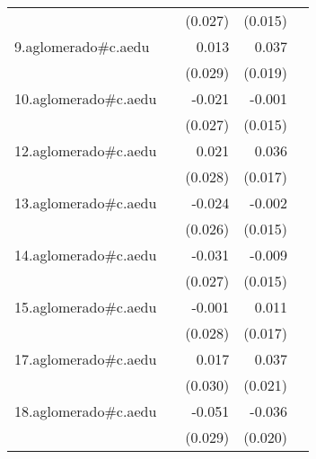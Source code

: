 {\begin{longtable}{l*{4}{D{.}{.}{-1}}}
            &                     &     (0.027)         &     (0.015)         &                     \\
\addlinespace
9.aglomerado#c.aedu&                     &       0.013         &       0.037         &                     \\
            &                     &     (0.029)         &     (0.019)         &                     \\
\addlinespace
10.aglomerado#c.aedu&                     &      -0.021         &      -0.001         &                     \\
            &                     &     (0.027)         &     (0.015)         &                     \\
\addlinespace
12.aglomerado#c.aedu&                     &       0.021         &       0.036\sym{*}  &                     \\
            &                     &     (0.028)         &     (0.017)         &                     \\
\addlinespace
13.aglomerado#c.aedu&                     &      -0.024         &      -0.002         &                     \\
            &                     &     (0.026)         &     (0.015)         &                     \\
\addlinespace
14.aglomerado#c.aedu&                     &      -0.031         &      -0.009         &                     \\
            &                     &     (0.027)         &     (0.015)         &                     \\
\addlinespace
15.aglomerado#c.aedu&                     &      -0.001         &       0.011         &                     \\
            &                     &     (0.028)         &     (0.017)         &                     \\
\addlinespace
17.aglomerado#c.aedu&                     &       0.017         &       0.037         &                     \\
            &                     &     (0.030)         &     (0.021)         &                     \\
\addlinespace
18.aglomerado#c.aedu&                     &      -0.051         &      -0.036         &                     \\
            &                     &     (0.029)         &     (0.020)         &                     \\

\end{longtable}}

